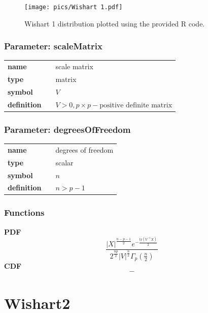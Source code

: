 \documentclass{article}
\begin{document}
\begin{figure}[ht!]
\centering
  \texttt{[image: pics/Wishart 1.pdf]}
 \caption{Wishart 1 distribution plotted using the provided R code.}
 \label{fig:Wishart 1}
\end{figure}

\subsubsection*{Parameter: scaleMatrix}

\noindent\begin{tabular}{p{2cm}cl}
\textbf{name} & & scale matrix \\
\textbf{type} & & matrix \\
\textbf{symbol} & & $V$  \\
\textbf{definition} & & $V > 0, p\times p - \text{positive definite matrix}$
\end{tabular}
\subsubsection*{Parameter: degreesOfFreedom}

\noindent\begin{tabular}{p{2cm}cl}
\textbf{name} & & degrees of freedom \\
\textbf{type} & & scalar \\
\textbf{symbol} & & $n$  \\
\textbf{definition} & & $n > p-1$
\end{tabular}
\subsubsection*{Functions}

\smallskip \noindent \hspace{.2cm} \textbf{PDF} 
\begin{equation*}\frac{|X|^{\frac{n-p-1}{2}} e^{-\frac{\text{tr}(V^{-1}X)}{2}}}{2^\frac{np}{2}|V|^\frac{n}{2}\Gamma_p(\frac{n}{2})}\end{equation*}
\smallskip \noindent \hspace{.2cm} \textbf{CDF} 
\begin{equation*}-\end{equation*}
\smallskip\section*{Wishart2} 

  \bigskip 
\end{document}
